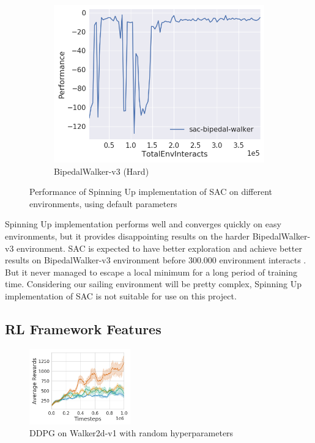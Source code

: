 \documentclass[12pt,twoside]{report}
\begin{document}
\begin{figure}[h]
\begin{subfigure}[t]{0.32\textwidth}
         \centering
         \includegraphics[width=\textwidth]{figures/rl-framework/sac-bipedal-walker.png}
         \caption{BipedalWalker-v3 (Hard)}
     \end{subfigure}
        \caption{Performance of Spinning Up implementation of SAC on different environments, using default parameters}
        \label{fig:spinup-SAC}
\end{figure}

Spinning Up implementation performs well and converges quickly on easy environments, but it provides disappointing results on the harder BipedalWalker-v3 environment. SAC is expected to have better exploration and achieve better results on BipedalWalker-v3 environment before 300.000 environment interacts \cite{gym-leaderboard}. But it never managed to escape a local minimum for a long period of training time. Considering our sailing environment will be pretty complex, Spinning Up implementation of SAC is not suitable for use on this project.

\subsection{RL Framework Features} \label{RLF:framework-features}

\begin{figure}
\vspace{-4em}
\centering
\includegraphics[width = 0.39\textwidth]{figures/rl-framework/hyperparameter-ddpg.png}
\caption{DDPG on Walker2d-v1 with random hyperparameters \cite{hyperparameter-ddpg}}
\label{fig:hyperparameter-ddpg}
\vspace{-1em}
\end{figure}
\end{document}
